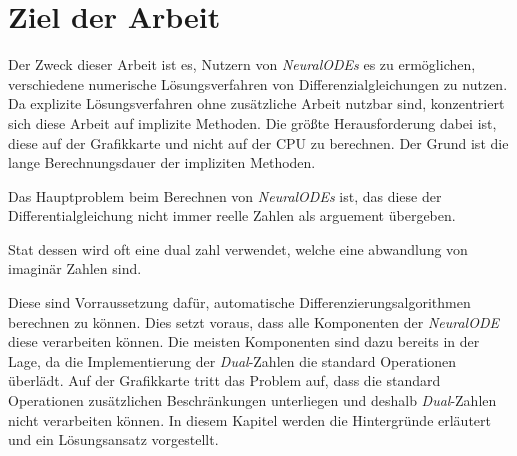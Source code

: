 
\section{Ziel der Arbeit}

Der Zweck dieser Arbeit ist es, Nutzern von \textit{NeuralODEs} \cite{neuralode} es zu ermöglichen, 
verschiedene numerische Lösungsverfahren von Differenzialgleichungen zu nutzen.
Da explizite Lösungsverfahren ohne zusätzliche Arbeit nutzbar sind,
konzentriert sich diese Arbeit auf implizite Methoden.
Die größte Herausforderung dabei ist, 
diese auf der Grafikkarte und nicht auf der CPU zu berechnen.
Der Grund ist die lange Berechnungsdauer der impliziten Methoden.



Das Hauptproblem beim Berechnen von \textit{NeuralODEs} ist, das diese der Differentialgleichung nicht immer reelle Zahlen als arguement übergeben.

Stat dessen wird oft eine dual zahl verwendet, welche eine abwandlung von 
imaginär Zahlen sind.

Diese sind Vorraussetzung dafür, 
automatische Differenzierungsalgorithmen berechnen zu können.
Dies setzt voraus, dass alle Komponenten der \textit{NeuralODE}\cite{neuralode} diese verarbeiten können.
Die meisten Komponenten sind dazu bereits in der Lage, 
da die Implementierung der \textit{Dual}-Zahlen
die standard Operationen überlädt.
Auf der Grafikkarte tritt das Problem auf, dass die standard Operationen 
zusätzlichen Beschränkungen unterliegen 
und deshalb \textit{Dual}-Zahlen nicht verarbeiten können.
In diesem Kapitel werden die Hintergründe erläutert und ein Lösungsansatz vorgestellt.

